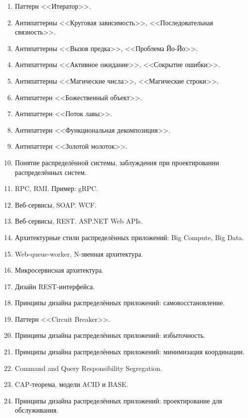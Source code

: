 \documentclass[a5paper]{article}
\begin{document}
\begin{enumerate}
    \item Паттерн <<Итератор>>.
    \item Антипаттерны <<Круговая зависимость>>, <<Последовательная связность>>.
    \item Антипаттерны <<Вызов предка>>, <<Проблема Йо-Йо>>.
    \item Антипаттерны <<Активное ожидание>>, <<Сокрытие ошибки>>.
    \item Антипаттерны <<Магические числа>>, <<Магические строки>>.
    \item Антипаттерн <<Божественный объект>>.
    \item Антипаттерн <<Поток лавы>>.
    \item Антипаттерн <<Функциональная декомпозиция>>.
    \item Антипаттерн <<Золотой молоток>>.
    \item Понятие распределённой системы, заблуждения при проектировании распределённых систем.
    \item RPC, RMI. Пример: gRPC.
    \item Веб-сервисы, SOAP. WCF.
    \item Веб-сервисы, REST. ASP.NET Web APIs.
    \item Архитектурные стили распределённых приложений: Big Compute, Big Data.
    \item Web-queue-worker, N-звенная архитектура.
    \item Микросервисная архитектура.
    \item Дизайн REST-интерфейса.
    \item Принципы дизайна распределённых приложений: самовосстановление.
    \item Паттерн <<Circuit Breaker>>.
    \item Принципы дизайна распределённых приложений: избыточность.
    \item Принципы дизайна распределённых приложений: минимизация координации.
    \item Command and Query Responsibility Segregation.
    \item CAP-теорема, модели ACID и BASE.
    \item Принципы дизайна распределённых приложений: проектирование для обслуживания.
\end{enumerate}
\end{document}
